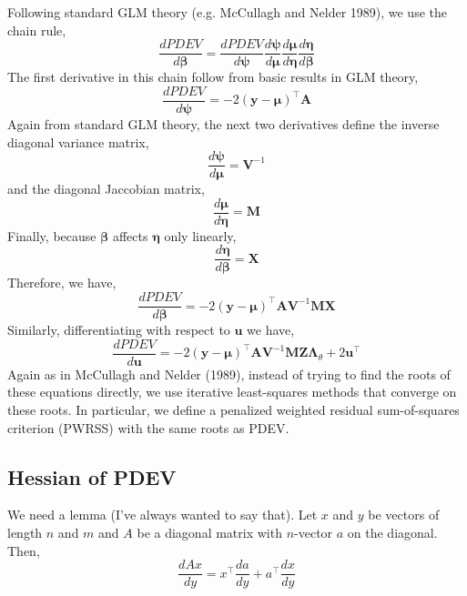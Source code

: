 \documentclass{jss}
\begin{document}
Following standard GLM theory (e.g. McCullagh and Nelder 1989), we use the chain rule,
\begin{displaymath}
\frac{d PDEV}{d \bm\beta} = 
\frac{d PDEV}{d \bm\psi}
\frac{d \bm\psi}{d \bm\mu}
\frac{d \bm\mu}{d \bm\eta}
\frac{d \bm\eta}{d \bm\beta}
\end{displaymath}
The first derivative in this chain follow from basic results in GLM theory,
\begin{displaymath}
\frac{d PDEV}{d \bm\psi} = 
-2(\bm y - \bm\mu)^\top \bm A
\end{displaymath}
Again from standard GLM theory, the next two derivatives define the inverse diagonal variance
matrix,
\begin{displaymath}
\frac{d \bm\psi}{d \bm\mu} = \bm V^{-1}
\end{displaymath}
and the diagonal Jaccobian matrix,
\begin{displaymath}
\frac{d \bm\mu}{d \bm\eta} = \bm M
\end{displaymath}
Finally, because $\bm\beta$ affects $\bm\eta$ only linearly,
\begin{displaymath}
\frac{d \bm\eta}{d \bm\beta} = \bm X
\end{displaymath}
Therefore, we have,
\begin{equation}
\frac{d PDEV}{d \bm\beta} = 
-2(\bm y - \bm\mu)^\top \bm A
\bm V^{-1}
\bm M
\bm X
\label{eq:dPDEVdbeta}
\end{equation}
Similarly, differentiating with respect to $\bm u$ we have,
\begin{equation}
\frac{d PDEV}{d \bm u} = 
-2(\bm y - \bm\mu)^\top \bm A
\bm V^{-1}
\bm M
\bm Z \bm\Lambda_\theta +
2\bm u^\top
\label{eq:dPDEVdu}
\end{equation}
Again as in McCullagh and Nelder (1989), instead of trying to find the
roots of these equations directly, we use iterative least-squares
methods that converge on these roots. In particular, we define a
penalized weighted residual sum-of-squares criterion (PWRSS) with the same
roots as PDEV.

\subsection{Hessian of PDEV}

We need a lemma (I've always wanted to say that). Let $x$ and $y$ be
vectors of length $n$ and $m$ and $A$ be a diagonal matrix with
$n$-vector $a$ on the diagonal. Then,
\begin{equation}
\frac{dAx}{dy} = x^\top \frac{da}{dy} + a^\top \frac{dx}{dy}
\end{equation}
\end{document}
